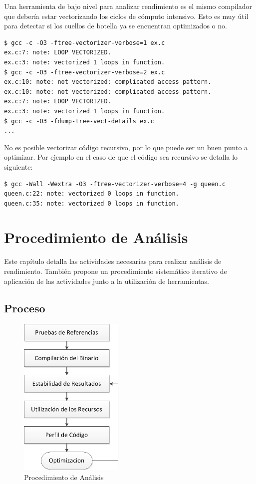 \documentclass[a4paper]{report}
\begin{document}
Una herramienta de bajo nivel para analizar rendimiento es el mismo compilador
que debería estar vectorizando los ciclos de cómputo intensivo. Esto es muy
útil para detectar si los cuellos de botella ya se encuentran optimizados o no.

\begin{lstlisting}
$ gcc -c -O3 -ftree-vectorizer-verbose=1 ex.c
ex.c:7: note: LOOP VECTORIZED.
ex.c:3: note: vectorized 1 loops in function.
$ gcc -c -O3 -ftree-vectorizer-verbose=2 ex.c
ex.c:10: note: not vectorized: complicated access pattern.
ex.c:10: note: not vectorized: complicated access pattern.
ex.c:7: note: LOOP VECTORIZED.
ex.c:3: note: vectorized 1 loops in function.
$ gcc -c -O3 -fdump-tree-vect-details ex.c
...
\end{lstlisting}

No es posible vectorizar código recursivo, por lo que puede ser un buen punto a
optimizar. Por ejemplo en el caso de que el código sea recursivo se detalla lo siguiente:

\begin{lstlisting}
$ gcc -Wall -Wextra -O3 -ftree-vectorizer-verbose=4 -g queen.c
queen.c:22: note: vectorized 0 loops in function.
queen.c:35: note: vectorized 0 loops in function.
\end{lstlisting}

\chapter{Procedimiento de Análisis}

Este capítulo detalla las actividades necesarias para realizar análisis de rendimiento. También propone un procedimiento sistemático iterativo de aplicación de las actividades junto a la utilización de herramientas.

\section{Proceso}

\begin{figure}[H]
\label{fig:procedure}
\begin{center}
\includegraphics[width=5cm]{procedure.png}
\caption{Procedimiento de Análisis}
\end{center}
\end{figure}
\end{document}
